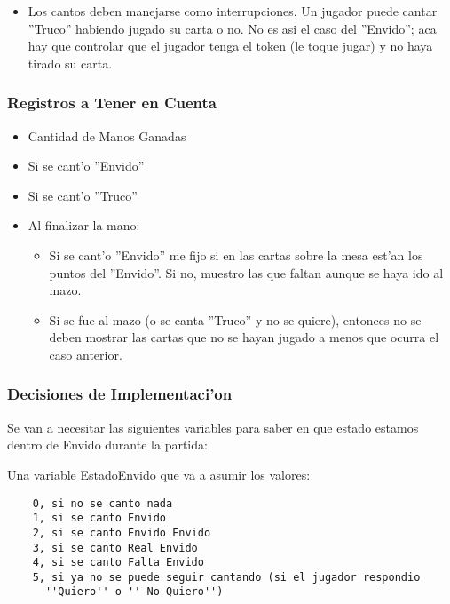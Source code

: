 
\begin{itemize}
\item Los cantos deben manejarse como interrupciones. Un jugador puede cantar ''Truco'' habiendo jugado su carta o no. No es asi el caso del ''Envido''; aca hay que controlar que el jugador tenga el token (le toque jugar) y no haya tirado su carta.
\end{itemize}

\subsubsection{Registros a Tener en Cuenta}
\begin{itemize}
\item Cantidad de Manos Ganadas
\item Si se cant'o ''Envido''
\item Si se cant'o ''Truco''
\item Al finalizar la mano:
	\begin{itemize}
    \item Si se cant'o ''Envido'' me fijo si en las cartas sobre la mesa est'an los puntos del ''Envido''. Si no, muestro las que faltan aunque se haya ido al mazo.
    \item Si se fue al mazo (o se canta ''Truco'' y no se quiere), entonces no se deben mostrar las cartas que no se hayan jugado a menos que ocurra el caso anterior.
	\end{itemize}
\end{itemize}

\subsubsection{Decisiones de Implementaci'on}
Se van a necesitar las siguientes variables para saber en que estado estamos dentro de Envido durante la
partida:


Una variable EstadoEnvido que va a asumir los valores:

\begin{verbatim}
    0, si no se canto nada
    1, si se canto Envido
    2, si se canto Envido Envido
    3, si se canto Real Envido
    4, si se canto Falta Envido
    5, si ya no se puede seguir cantando (si el jugador respondio
      ''Quiero'' o '' No Quiero'')
\end{verbatim}

